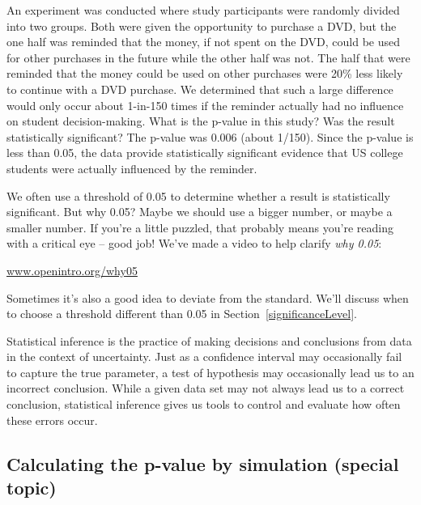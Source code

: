 \begin{example}{An experiment was conducted where study participants were randomly divided into two groups. Both were given the opportunity to purchase a DVD, but the one half was reminded that the money, if not spent on the DVD, could be used for other purchases in the future while the other half was not. The half that were reminded that the money could be used on other purchases were 20\% less likely to continue with a DVD purchase. We determined that such a large difference would only occur about 1-in-150 times if the reminder actually had no influence on student decision-making. What is the p-value in this study? Was the result statistically significant?}
The p-value was 0.006 (about 1/150). Since the p-value is less than 0.05, the data provide statistically significant evidence that US college students were actually influenced by the reminder.
\end{example}

\begin{termBox}{
We often use a threshold of 0.05 to determine whether a result is statistically significant. But why 0.05? Maybe we should use a bigger number, or maybe a smaller number. If you're a little puzzled, that probably means you're reading with a critical eye -- good job! We've made a video to help clarify \emph{why 0.05}:
\begin{center}
\href{http://www.openintro.org/why05}{www.openintro.org/why05}
\end{center}
Sometimes it's also a good idea to deviate from the standard. We'll discuss when to choose a threshold different than 0.05 in Section~\ref{significanceLevel}.\vspace{0.5mm}}
\end{termBox}

Statistical inference is the practice of making decisions and conclusions from data in the context of uncertainty. Just as a confidence interval may occasionally fail to capture the true parameter, a test of hypothesis may occasionally lead us to an incorrect conclusion. While a given data set may not always lead us to a correct conclusion, statistical inference gives us tools to control and evaluate how often these errors occur.


\subsection{Calculating the p-value by simulation (special topic)}

